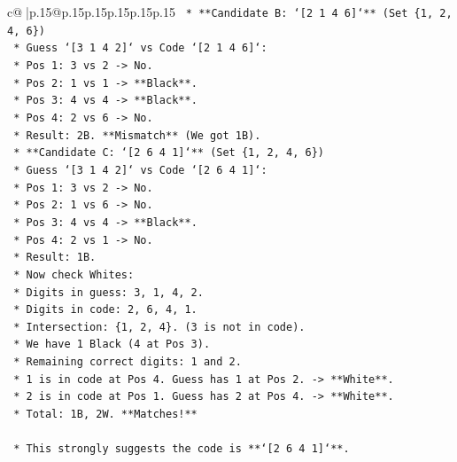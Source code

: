 \documentclass{article}
\begin{document}
{\begin{supertabular}{c@{$\;$}|p{.15\linewidth}@{}p{.15\linewidth}p{.15\linewidth}p{.15\linewidth}p{.15\linewidth}p{.15\linewidth}}
{{{\texttt{        *   **Candidate B: `{[}2 1 4 6{]}`** (Set \{1, 2, 4, 6\})} \\
\texttt{            *   Guess `{[}3 1 4 2{]}` vs Code `{[}2 1 4 6{]}`:} \\
\texttt{                *   Pos 1: 3 vs 2 {-}> No.} \\
\texttt{                *   Pos 2: 1 vs 1 {-}> **Black**.} \\
\texttt{                *   Pos 3: 4 vs 4 {-}> **Black**.} \\
\texttt{                *   Pos 4: 2 vs 6 {-}> No.} \\
\texttt{                *   Result: 2B. **Mismatch** (We got 1B).} \\
\texttt{        *   **Candidate C: `{[}2 6 4 1{]}`** (Set \{1, 2, 4, 6\})} \\
\texttt{            *   Guess `{[}3 1 4 2{]}` vs Code `{[}2 6 4 1{]}`:} \\
\texttt{                *   Pos 1: 3 vs 2 {-}> No.} \\
\texttt{                *   Pos 2: 1 vs 6 {-}> No.} \\
\texttt{                *   Pos 3: 4 vs 4 {-}> **Black**.} \\
\texttt{                *   Pos 4: 2 vs 1 {-}> No.} \\
\texttt{                *   Result: 1B.} \\
\texttt{                *   Now check Whites:} \\
\texttt{                    *   Digits in guess: 3, 1, 4, 2.} \\
\texttt{                    *   Digits in code: 2, 6, 4, 1.} \\
\texttt{                    *   Intersection: \{1, 2, 4\}. (3 is not in code).} \\
\texttt{                    *   We have 1 Black (4 at Pos 3).} \\
\texttt{                    *   Remaining correct digits: 1 and 2.} \\
\texttt{                    *   1 is in code at Pos 4. Guess has 1 at Pos 2. {-}> **White**.} \\
\texttt{                    *   2 is in code at Pos 1. Guess has 2 at Pos 4. {-}> **White**.} \\
\texttt{                    *   Total: 1B, 2W. **Matches!**} \\
\\ 
\texttt{    *   This strongly suggests the code is **`{[}2 6 4 1{]}`**.} \\
}}}
\end{supertabular}}
\end{document}
